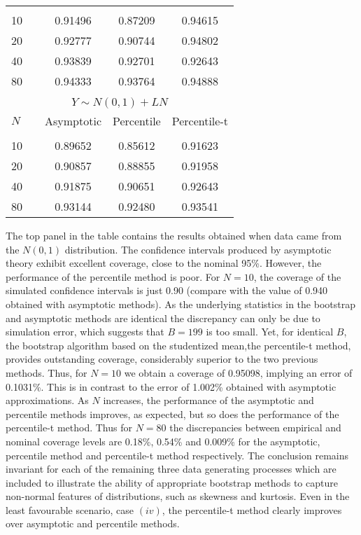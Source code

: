 \documentclass[english, 11pt,a4paper, ]{article}
\begin{document}
\begin{table}
\begin{tabular}{lcccc}
		\hline \multicolumn{5}{c}{}\\
		10 & &0.91496   &   0.87209& 0.94615\\
		20 &&  0.92777  &    0.90744&0.94802\\
		40 &&0.93839   &  0.92701 &0.92643\\
		80 && 0.94333  &    0.93764 &0.94888\\
		\multicolumn{5}{c}{}\\
		\multicolumn{5}{c}{ $ Y\sim N(0,1) + LN $}\\
		$ N $&&Asymptotic & Percentile & Percentile-t\\
		\hline \multicolumn{5}{c}{}\\
		10 & & 0.89652 &     0.85612 &0.91623\\
		20 &&  0.90857 &     0.88855&0.91958\\
		40 &&0.91875   &   0.90651 &0.92643\\
		80 && 0.93144  &    0.92480&0.93541\\
		\hline \hline
	\end{tabular}
	\label{table_simulation_1}
\end{table}
The top panel in the table contains the results obtained when data came from the $N(0,1)$ distribution.
The confidence intervals produced by asymptotic theory exhibit excellent coverage, close to the nominal 95\%. However, the performance of the percentile method is poor.
For $ N=10 $, the coverage of the simulated confidence intervals is just 0.90 (compare with the value of 0.940 obtained with asymptotic methods).
As the underlying statistics in the bootstrap and asymptotic methods are identical
the discrepancy can only be due  to simulation error, which suggests that $ B=199 $ is too small.
Yet, for identical $ B $, the bootstrap algorithm based on the studentized mean,the percentile-t method, provides outstanding coverage, considerably superior to the two previous methods.
Thus, for $ N=10 $ we obtain a coverage of 0.95098, implying an error of 0.1031\%. This is in contrast to the  error of  1.002\% obtained with asymptotic approximations.
As $ N $ increases, the performance of the asymptotic and percentile methods improves, as expected, but so does the performance of the percentile-t method.
Thus for $ N=80 $ the discrepancies between empirical and nominal coverage levels are 0.18\%, 0.54\% and 0.009\% for the asymptotic, percentile method and percentile-t method respectively.
The conclusion remains invariant for each of the remaining three data generating processes which are included to illustrate the ability of appropriate bootstrap methods to capture non-normal features of distributions, such as skewness and kurtosis.
Even in the least favourable scenario, case $(iv)$, the percentile-t method clearly improves over asymptotic and percentile methods.
\end{document}
